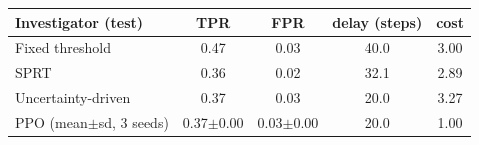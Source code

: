 \begin{tabular}{lcccc}
\toprule
Investigator (test) & TPR & FPR & delay (steps) & cost \\
\midrule
Fixed threshold & 0.47 & 0.03 & 40.0 & 3.00 \\
SPRT & 0.36 & 0.02 & 32.1 & 2.89 \\
Uncertainty-driven & 0.37 & 0.03 & 20.0 & 3.27 \\
PPO (mean$\pm$sd, 3 seeds) & 0.37$\pm$0.00 & 0.03$\pm$0.00 & 20.0 & 1.00 \\
\bottomrule
\end{tabular}